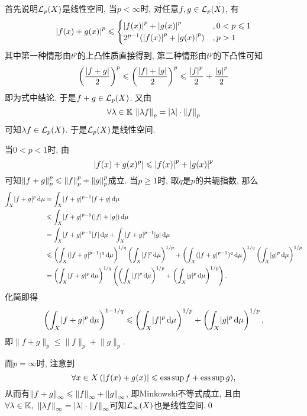     \begin{Proof}
    首先说明$ \mathcal{L}_p(X) $是线性空间, 当$ p<\infty $时, 对任意$ f, g\in\mathcal{L}_p(X) $, 有
    \[
    \left| f(x)+g(x) \right| ^p\leqslant\begin{cases}
    \left| f(x) \right| ^p+\left| g(x) \right| ^p & ,0<p\leqslant 1\\
    2^{p-1}(\left| f(x) \right| ^p+\left| g(x) \right| ^p) & ,p>1
    \end{cases}
    \]
    其中第一种情形由$ t^p $的上凸性质直接得到, 第二种情形由$ t^p $的下凸性可知
    \[
    \left(\frac{\left| f+g \right| }{2}\right)^p\leqslant\left(\frac{\left| f \right| +\left| g \right| }{2}\right)^p\leqslant\frac{\left| f \right| ^p}{2}+\frac{\left| g \right| ^p}{2}
    \]
    即为式中结论. 于是$ f+g\in\mathcal{L}_p(X) $. 又由
    \[
    \forall\lambda\in\mathbb{K}\,\left\| \lambda f \right\|_p=\left| \lambda \right| \cdot\left\| f \right\|_p
    \]
    可知$ \lambda f\in\mathcal{L}_p(X) $. 于是$ \mathcal{L}_p(X) $是线性空间.

    当$ 0<p<1 $时, 由
    \[
        \left| f(x)+g(x)^p \right| \leqslant\left| f(x) \right| ^p+\left| g(x) \right| ^p
    \]
    可知$ \left\| f+g \right\|_p^p\leqslant \left\| f \right\|_p^p+\left\| g \right\|_p^p $成立. 当$ p\geqslant 1 $时, 取$ q $是$ p $的共轭指数, 那么
    \begin{align*}
        \int_X\lvert f+g\rvert^p\,\mathrm{d}\mu&=\int_X\lvert f+g\rvert^{p-1}\lvert f+g\rvert\,\mathrm{d}\mu\\
        &\leqslant\int_X\lvert f+g\rvert^{p-1}(\lvert f\rvert+\lvert g\rvert)\,\mathrm{d}\mu\\
        &=\int_X\lvert f+g\rvert^{p-1}\lvert f\rvert\,\mathrm{d}\mu+\int_X\lvert f+g\rvert^{p-1}\lvert g\rvert\,\mathrm{d}\mu\\
        &\leqslant\left( \int_X(\lvert f+g\rvert^{p-1})^q\,\mathrm{d}\mu \right)^{1/q}\left(\int_X\lvert f\rvert^p\,\mathrm{d}\mu\right)^{1/p}+\left( \int_X(\lvert f+g\rvert^{p-1})^q\,\mathrm{d}\mu \right)^{1/q}\left(\int_X\lvert g\rvert^p\,\mathrm{d}\mu\right)^{1/p}\\
        &=\left( \int_X\lvert f+g\rvert^p\,\mathrm{d}\mu \right)^{1/q}\left( \left( \int_X\lvert f\rvert^p\,\mathrm{d}\mu \right)^{1/p}+\left( \int_X\lvert g\rvert^p\,\mathrm{d}\mu \right)^{1/p} \right).
    \end{align*}
    化简即得
    \[
        \left( \int_X\lvert f+g\rvert^p\,\mathrm{d}\mu \right)^{1-1/q}\leqslant\left( \int_X\lvert f\rvert^p\,\mathrm{d}\mu \right)^{1/p}+\left( \int_X\lvert g\rvert^p\,\mathrm{d}\mu \right)^{1/p},
    \]
    即$ \lVert f+g\rVert_p\leqslant\lVert f\rVert_p+\lVert g\rVert_p $.

    而$ p=\infty $时, 注意到
    \[
        \forall x\in X\,(\left| f(x)+g(x) \right| \leqslant\operatorname{ess\,sup} f+\operatorname{ess\,sup} g),
    \]
    从而有$ \left\| f+g \right\|_\infty\leqslant\left\| f \right\|_\infty+\left\| g \right\|_\infty $, 即Minkowski不等式成立, 且由$ \forall\lambda\in\mathbb{K},\ \left\| \lambda f \right\|_\infty=\left| \lambda \right| \cdot\left\| f \right\|_\infty $可知$ \mathcal{L}_\infty(X) $也是线性空间.\qed
    \end{Proof}

